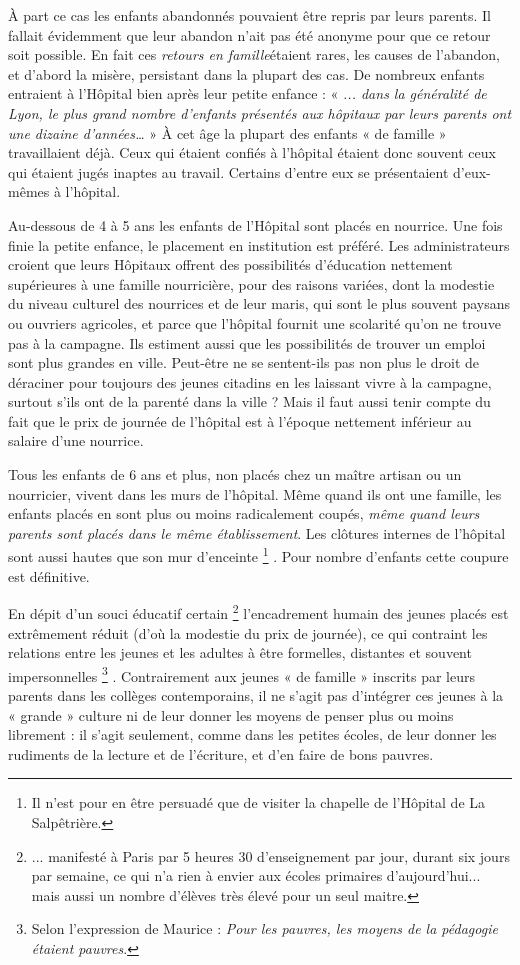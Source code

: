  À part ce cas les enfants abandonnés pouvaient être repris par leurs parents. Il fallait évidemment que leur abandon n'ait pas été anonyme pour que ce retour soit possible. En fait ces \emph{retours en famille}étaient rares, les causes de l'abandon, et d'abord la misère, persistant dans la plupart des cas.
 De nombreux enfants entraient à l'Hôpital bien après leur petite enfance : « \emph{... dans la généralité de Lyon, le plus grand nombre d'enfants présentés aux hôpitaux par leurs parents ont une dizaine d'années…} » À cet âge la plupart des enfants « de famille » travaillaient déjà. Ceux qui étaient confiés à l'hôpital étaient donc souvent ceux qui étaient jugés inaptes au travail. Certains d'entre eux se présentaient d'eux-mêmes à l'hôpital. 

 Au-dessous de 4 à 5 ans les enfants de l'Hôpital sont placés en nourrice. Une fois finie la petite enfance, le placement en institution est préféré. Les administrateurs croient que leurs Hôpitaux offrent des possibilités d'éducation nettement supérieures à une famille nourricière, pour des raisons variées, dont la modestie du niveau culturel des nourrices et de leur maris, qui sont le plus souvent paysans ou ouvriers agricoles, et parce que l'hôpital fournit une scolarité qu'on ne trouve pas à la campagne. Ils estiment aussi que les possibilités de trouver un emploi sont plus grandes en ville. Peut-être ne se sentent-ils pas non plus le droit de déraciner pour toujours des jeunes citadins en les laissant vivre à la campagne, surtout s'ils ont de la parenté dans la ville ? Mais il faut aussi tenir compte du fait que le prix de journée de l'hôpital est à l'époque nettement inférieur au salaire d'une nourrice.

 Tous les enfants de 6 ans et plus, non placés chez un maître artisan ou un nourricier, vivent dans les murs de l'hôpital. Même quand ils ont une famille, les enfants placés en sont plus ou moins radicalement coupés, \emph{même quand leurs parents sont placés dans le même établissement}. Les clôtures internes de l'hôpital sont aussi hautes que son mur d'enceinte%
\footnote{Il n'est pour en être persuadé que de visiter la chapelle de l'Hôpital de La Salpêtrière.} 
. Pour nombre d'enfants cette coupure est définitive. 

 En dépit d'un souci éducatif certain%
\footnote{... manifesté à Paris par 5 heures 30 d'enseignement par jour, durant six jours par semaine, ce qui n'a rien à envier aux écoles primaires d'aujourd'hui... mais aussi un nombre d'élèves très élevé pour un seul maitre.} 
l'encadrement humain des jeunes placés est extrêmement réduit (d'où la modestie du prix de journée), ce qui contraint les relations entre les jeunes et les adultes à être formelles, distantes et souvent impersonnelles%
\footnote{Selon l'expression de Maurice  : \emph{Pour les pauvres, les moyens de la pédagogie étaient pauvres}.}%
. Contrairement aux jeunes « de famille » inscrits par leurs parents dans les collèges contemporains, il ne s'agit pas d'intégrer ces jeunes à la « grande » culture ni de leur donner les moyens de penser plus ou moins librement : il s'agit seulement, comme dans les petites écoles, de leur donner les rudiments de la lecture et de l'écriture, et d'en faire de bons pauvres.

